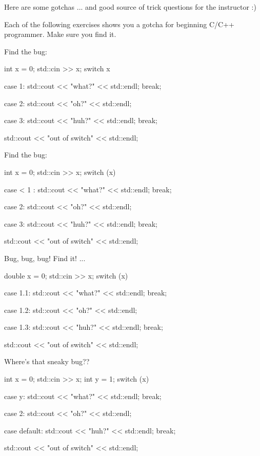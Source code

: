 Here are some gotchas ... and good source of trick questions for the
instructor :)

Each of the following exercises shows you a gotcha for beginning C/C++
programmer. Make sure you find it.

\begin{ex}
Find the bug:
\begin{console}
int x = 0;
std::cin >> x;
switch x
{
     case 1:
          std::cout << "what?" << std::endl;
          break;
          
     case 2:
          std::cout << "oh?" << std::endl;
          
     case 3:
          std::cout << "huh?" << std::endl;
          break;
}
std::cout << "out of switch" << std::endl;
\end{console}
\end{ex}

\begin{ex}
Find the bug:
\begin{console}
int x = 0;
std::cin >> x;
switch (x)
{
        case < 1 :
             std::cout << "what?" << std::endl;
             break;
             
        case 2:
             std::cout << "oh?" << std::endl;
             
        case 3:
             std::cout << "huh?" << std::endl;
             break;
}
std::cout << "out of switch" << std::endl;
\end{console}
\end{ex}


\begin{ex}
Bug, bug, bug! Find it! ...
\begin{console}
double x = 0;
std::cin >> x;
switch (x)
{
        case 1.1:
             std::cout << "what?" << std::endl;
             break;
             
        case 1.2:
             std::cout << "oh?" << std::endl;
        
        case 1.3:
             std::cout << "huh?" << std::endl;
             break;
}
std::cout << "out of switch" << std::endl;
\end{console}
\end{ex}

\begin{ex}
Where's that sneaky bug??
\begin{console}
int x = 0;
std::cin >> x;
int y = 1;
switch (x)
{
        case y:
             std::cout << "what?" << std::endl;
             break;

        case 2:
             std::cout << "oh?" << std::endl;

        case default:
             std::cout << "huh?" << std::endl;
             break;
}
std::cout << "out of switch" << std::endl;
\end{console}
\end{ex}

